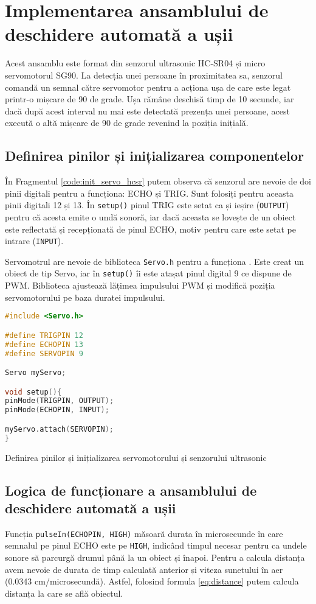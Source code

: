 \section{Implementarea ansamblului de deschidere automată a ușii}
Acest ansamblu este format din senzorul ultrasonic HC-SR04 și micro servomotorul SG90. La detecția unei persoane în proximitatea sa, senzorul comandă un semnal către servomotor pentru a acționa ușa de care este legat printr-o mișcare de 90 de grade. Ușa rămâne deschisă timp de 10 secunde, iar dacă după acest interval nu mai este detectată prezența unei persoane, acest execută o altă mișcare de 90 de grade revenind la poziția inițială.

\subsection{Definirea pinilor și inițializarea componentelor}
În Fragmentul \ref{code:init_servo_hcsr} putem observa că senzorul are nevoie de doi pinii digitali pentru a funcționa: ECHO și TRIG. Sunt folosiți pentru aceasta pinii digitali 12 și 13. În \texttt{setup()} pinul TRIG este setat ca și ieșire (\texttt{OUTPUT}) pentru că acesta emite o undă sonoră, iar dacă aceasta se lovește de un obiect este reflectată și recepționată de pinul ECHO, motiv pentru care este setat pe intrare (\texttt{INPUT}).

Servomotrul are nevoie de biblioteca \texttt{Servo.h} pentru a funcționa \cite{lib_servo}. Este creat un obiect de tip Servo, iar în \texttt{setup()} îi este atașat pinul digital 9 ce dispune de PWM. Biblioteca ajustează lățimea impulsului PWM și modifică poziția servomotorului pe baza duratei impulsului.

\begin{code}[H]
\begin{lstlisting}[language=C++]
#include <Servo.h>

#define TRIGPIN 12
#define ECHOPIN 13
#define SERVOPIN 9

Servo myServo;

void setup(){
pinMode(TRIGPIN, OUTPUT);
pinMode(ECHOPIN, INPUT);

myServo.attach(SERVOPIN);
}
\end{lstlisting}
\caption{Definirea pinilor și inițializarea servomotorului și senzorului ultrasonic}
\label{code:init_servo_hcsr}
\end{code}

\subsection{Logica de funcționare a ansamblului de deschidere automată a ușii}
Funcția \texttt{pulseIn(ECHOPIN, HIGH)} măsoară durata în microsecunde în care semnalul pe pinul ECHO este pe \texttt{HIGH}, indicând timpul necesar pentru ca undele sonore să parcurgă drumul până la un obiect și înapoi. Pentru a calcula distanța avem nevoie de durata de timp calculată anterior și viteza sunetului în aer (0.0343 cm/microsecundă). Astfel, folosind formula \ref{eq:distance} putem calcula distanța la care se află obiectul.

